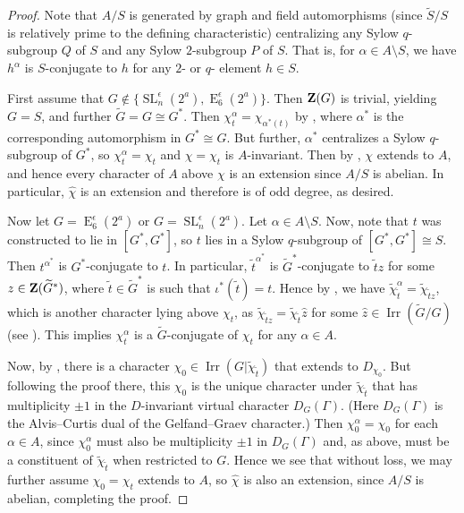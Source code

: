\documentclass[12pt,leqno,a4paper]{amsart}
\newcommand{\Irr}{{\operatorname{Irr}}}
\newcommand{\SL}{{\operatorname{SL}}}
\def\zent#1{{\bf Z}(#1)}
\theoremstyle{remark}
\newcommand\wt[1]{\widetilde{#1}}
\newcommand\type[1]{\operatorname{#1}}
\begin{document}
\begin{proof}
    Note that $A/S$ is generated by graph and field automorphisms (since $\wt{S}/S$ is relatively prime to the defining characteristic) centralizing any Sylow $q$-subgroup $Q$ of $S$ and any Sylow $2$-subgroup $P$ of $S$.  That is, for $\alpha\in A\setminus S$, we have $h^\alpha$ is $S$-conjugate to $h$ for any $2$- or $q$- element $h\in S$.  
    
    First assume that $G\not\in\{\SL_n^\epsilon(2^a), \type{E}_6^\epsilon(2^a)\}$.  Then  $\zent{G}$ is trivial, yielding $G=S$, and further $\wt{G}=G\cong G^\ast$.  Then  $\chi_t^\alpha=\chi_{\alpha^\ast(t)}$ by \cite[Corollary 2.5]{NTT08}, where $\alpha^\ast$ is the corresponding automorphism in $G^\ast\cong G$.  But further, $\alpha^\ast$ centralizes a Sylow $q$-subgroup of $G^\ast$, so $\chi_t^\alpha=\chi_t$ and $\chi=\chi_t$ is $A$-invariant. Then by \cite[Proposition 3.4]{spath12}, $\chi$ extends to $A$, and hence every character of $A$ above $\chi$ is an extension since $A/S$ is abelian.  In particular, $\hat\chi$ is an extension and therefore is of odd degree, as desired.
    
    Now let $G=\type{E}_6^\epsilon(2^a)$ or $G=\SL_n^\epsilon(2^a)$.
Let $\alpha\in A\setminus S$. Now, note that $t$ was constructed to lie in  $[G^\ast, G^\ast]$, so $t$ lies in a Sylow $q$-subgroup of $[G^\ast, G^\ast]\cong S$.  
Then $t^{\alpha^\ast}$ is $G^\ast$-conjugate to $t$.  In particular, $\wt{t}^{\alpha^\ast}$ is $\wt{G}^\ast$-conjugate to $\wt{t}z$ for some $z\in\zent{\wt{G}^\ast}$, where $\wt{t}\in\wt{G}^\ast$ is such that $\iota^\ast(\wt{t})=t$.  
Hence by \cite[Corollary 2.5]{NTT08}, we have $\wt{\chi}_{\wt{t}}^{\alpha}=\wt{\chi}_{\wt{t}z}$, which is another character lying above $\chi_t$, as $\wt{\chi}_{\wt{t}z}=\wt{\chi}_{\wt{t}}\hat z$ for some $\hat z\in \Irr(\wt{G}/G)$ (see \cite[Proposition 2.5.21]{GM20}).  
This implies $\chi_t^\alpha$ is a $\wt{G}$-conjugate of $\chi_t$ for any $\alpha\in A$.  

 
Now, by \cite[Proposition 3.4]{spath12}, there is a character $\chi_0\in\Irr(G|\wt{\chi}_{\wt{t}})$ that extends to $D_{\chi_0}$.  But following the proof there, this $\chi_0$ is the unique character under $\wt{\chi}_{\wt{t}}$ that has multiplicity $\pm1$ in the $D$-invariant virtual character $D_G(\Gamma)$. (Here $D_G(\Gamma)$ is the Alvis--Curtis dual of the Gelfand--Graev character.)  Then $\chi_0^\alpha = \chi_0$ for each $\alpha\in A$, since $\chi_0^\alpha$ must also be multiplicity $\pm1$ in $D_G(\Gamma)$ and, as above, must be a constituent of $\wt{\chi}_{\wt{t}}$ when restricted to $G$.  Hence we see that without loss, we may further assume $\chi_0=\chi_t$ extends to $A$, so $\hat\chi$ is also an extension, since $A/S$ is abelian, completing the proof.
\end{proof}
\end{document}
